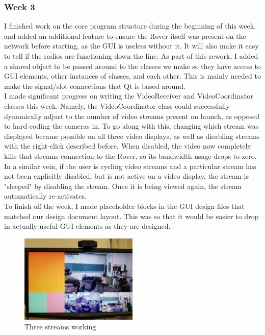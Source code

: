 \subsubsection{Week 3}
I finished work on the core program structure during the beginning of this week, and added an additional feature to ensure the Rover itself was present on the network before starting, as the GUI is useless without it. It will also make it easy to tell if the radios are functioning down the line. As part of this rework, I added a shared object to be passed around to the  classes we make so they have access to GUI elements, other instances of classes, and each other. This is mainly needed to make the signal/slot connections that Qt is based around.
\\
I made significant progress on writing the VideoReceiver and VideoCoordinator classes this week. Namely, the VideoCoordinator class could successfully dynamically adjust to the number of video streams present on launch, as opposed to hard coding the cameras in. To go along with this, changing which stream was displayed became possible on all three video displays, as well as disabling streams with the right-click described before. When disabled, the video now completely kills that streams connection to the Rover, so its bandwidth usage drops to zero. In a similar vein, if the user is cycling video streams and a particular stream has not been explicitly disabled, but is not active on a video display, the stream is "sleeped" by disabling the stream. Once it is being viewed again, the stream automatically re-activates.
\\
To finish off the week, I made placeholder blocks in the GUI design files that matched our design document layout. This was so that it would be easier to drop in actually useful GUI elements as they are designed.
\begin{figure}[h!]
  \centering
  \captionsetup{justification=centering}
  \includegraphics[width=0.5\textwidth]{figures/video_working}
  \caption{Three streams working}
\end{figure}

